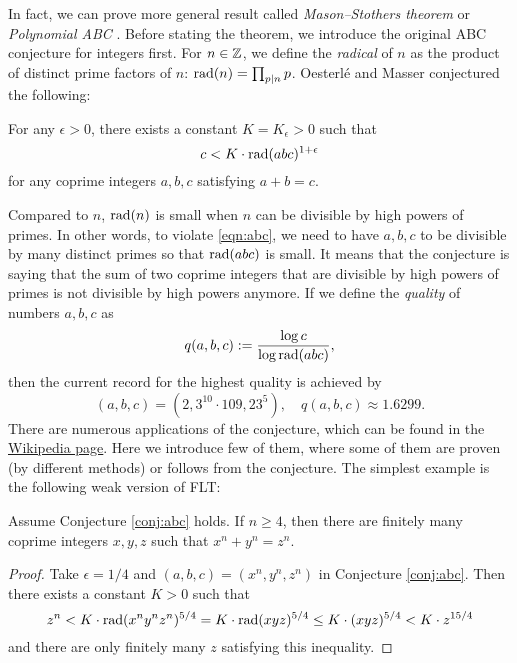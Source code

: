 In fact, we can prove more general result called \emph{Mason--Stothers theorem} or \emph{Polynomial ABC} \cite{mason1984diophantine,stothers1981polynomial,snyder2000alternate}.
Before stating the theorem, we introduce the original ABC conjecture for integers first.
For \( n \in \mathbb{Z} \), we define the \emph{radical} of \( n \) as the product of distinct prime factors of \( n \): \(\mathrm{rad}(n) = \prod_{p \mid n} p\).
Oesterl\'e and Masser conjectured the following:
\begin{conjecture}
\label{conj:abc}
For any \( \epsilon > 0 \), there exists a constant \( K = K_\epsilon > 0 \) such that
\begin{equation}
\label{eqn:abc}
c < K \cdot \mathrm{rad}(abc)^{1 + \epsilon}
\end{equation}
for any coprime integers \( a, b, c \) satisfying \( a + b = c \).
\end{conjecture}
Compared to $n$, $\mathrm{rad}(n)$ is small when $n$ can be divisible by high powers of primes.
In other words, to violate \eqref{eqn:abc}, we need to have $a, b, c$ to be divisible by many distinct primes so that $\mathrm{rad}(abc)$ is small.
It means that the conjecture is saying that the sum of two coprime integers that are divisible by high powers of primes is not divisible by high powers anymore.
If we define the \emph{quality} of numbers \( a, b, c \) as
\[
q(a, b, c) := \frac{\log c}{\log \mathrm{rad}(abc)},
\]
then the current record for the highest quality is achieved by
\[
(a, b, c) = (2, 3^{10} \cdot 109, 23^5), \quad q(a, b, c) \approx 1.6299.
\]
There are numerous applications of the conjecture, which can be found in the \href{https://en.wikipedia.org/wiki/Abc_conjecture}{Wikipedia page}.
Here we introduce few of them, where some of them are proven (by different methods) or follows from the conjecture.
The simplest example is the following weak version of FLT:
\begin{theorem}
    Assume Conjecture \ref{conj:abc} holds.
    If \( n \ge 4 \), then there are finitely many coprime integers \( x, y, z \) such that \( x^n + y^n = z^n \).
\end{theorem}
\begin{proof}
    Take $\epsilon = 1/4$ and \( (a, b, c) = (x^n, y^n, z^n) \) in Conjecture \ref{conj:abc}.
    Then there exists a constant \( K > 0 \) such that
    \[
    z^n < K \cdot \mathrm{rad}(x^n y^n z^n)^{5 / 4} = K \cdot \mathrm{rad}(xyz)^{5 / 4} \le K \cdot (xyz)^{5 / 4} < K \cdot z^{15 / 4}
    \]
    and there are only finitely many \( z \) satisfying this inequality.
\end{proof}

